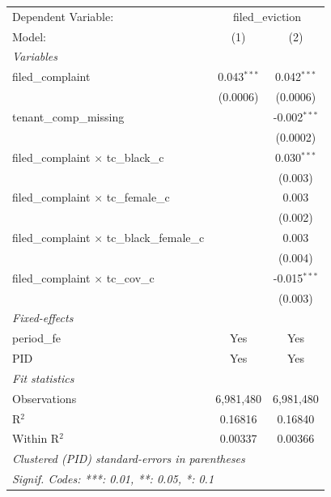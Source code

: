 \par\endgroup
\begingroup
\centering
\begin{tabular}{lcc}
   \tabularnewline \midrule \midrule
   Dependent Variable: & \multicolumn{2}{c}{filed\_eviction}\\
   Model:                                              & (1)           & (2)\\  
   \midrule
   \emph{Variables}\\
   filed\_complaint                                    & 0.043$^{***}$ & 0.042$^{***}$\\   
                                                       & (0.0006)      & (0.0006)\\   
   tenant\_comp\_missing                               &               & -0.002$^{***}$\\   
                                                       &               & (0.0002)\\   
   filed\_complaint $\times$ tc\_black\_c              &               & 0.030$^{***}$\\   
                                                       &               & (0.003)\\   
   filed\_complaint $\times$ tc\_female\_c             &               & 0.003\\   
                                                       &               & (0.002)\\   
   filed\_complaint $\times$ tc\_black\_female\_c      &               & 0.003\\   
                                                       &               & (0.004)\\   
   filed\_complaint $\times$ tc\_cov\_c                &               & -0.015$^{***}$\\   
                                                       &               & (0.003)\\   
   \midrule
   \emph{Fixed-effects}\\
   period\_fe                                          & Yes           & Yes\\  
   PID                                                 & Yes           & Yes\\  
   \midrule
   \emph{Fit statistics}\\
   Observations                                        & 6,981,480     & 6,981,480\\  
   R$^2$                                               & 0.16816       & 0.16840\\  
   Within R$^2$                                        & 0.00337       & 0.00366\\  
   \midrule \midrule
   \multicolumn{3}{l}{\emph{Clustered (PID) standard-errors in parentheses}}\\
   \multicolumn{3}{l}{\emph{Signif. Codes: ***: 0.01, **: 0.05, *: 0.1}}\\
\end{tabular}
